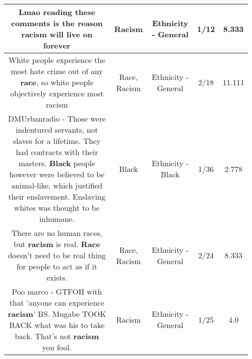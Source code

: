 \documentclass[11pt]{article}
\newlength\mylength
\begin{document}
\begin{center}
\begin{longtable}{|C{.65\mylength}|C{.30\mylength}|C{.12\mylength}|C{.12\mylength}|C{.12\mylength}|}
  \small Lmao reading these comments is the reason \textbf{racism} will live on forever\normalsize   & Racism & Ethnicity - General & 1/12 & 8.333 \\  \hline
  \small White people experience the most hate crime out of any \textbf{race}, so white people objectively experience most racism\normalsize   & Race, Racism & Ethnicity - General & 2/18 & 11.111 \\  \hline
  \small DMUrbanradio - Those were indentured servants, not slaves for a lifetime. They had contracts with their masters. \textbf{Black} people however were believed to be animal-like, which justified their enslavement. Enslaving whites was thought to be inhumane.\normalsize   & Black & Ethnicity - Black & 1/36 & 2.778 \\  \hline
  \small There are no human races, but \textbf{racism} is real. \textbf{Race} doesn't need to be real thing for people to act as if it exists.\normalsize   & Race, Racism & Ethnicity - General & 2/24 & 8.333 \\  \hline
  \small Poo marco - GTFOH with that 'anyone can experience \textbf{racism}' BS. Mugabe TOOK BACK what was his to take back. That's not \textbf{racism} you fool.\normalsize   & Racism & Ethnicity - General & 1/25 & 4.0 \\  \hline

\end{longtable}
\end{center}
\end{document}
